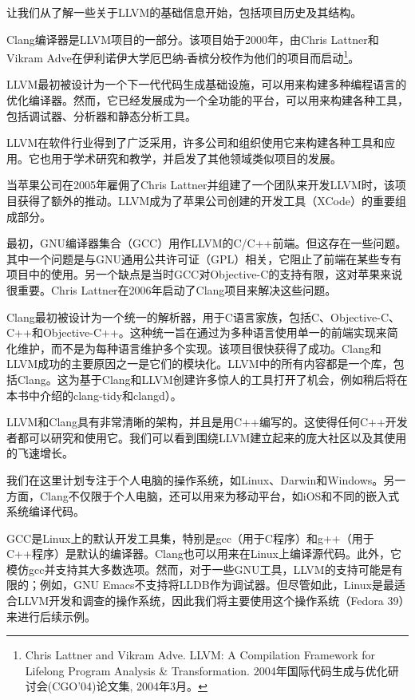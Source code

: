 让我们从了解一些关于LLVM的基础信息开始，包括项目历史及其结构。


Clang编译器是LLVM项目的一部分。该项目始于2000年，由Chris Lattner和Vikram Adve在伊利诺伊大学厄巴纳-香槟分校作为他们的项目而启动\footnote{Chris Lattner and Vikram Adve. LLVM: A Compilation Framework for Lifelong Program Analysis \& Transformation. 2004年国际代码生成与优化研讨会(CGO'04)论文集, 2004年3月。}。

LLVM最初被设计为一个下一代代码生成基础设施，可以用来构建多种编程语言的优化编译器。然而，它已经发展成为一个全功能的平台，可以用来构建各种工具，包括调试器、分析器和静态分析工具。

LLVM在软件行业得到了广泛采用，许多公司和组织使用它来构建各种工具和应用。它也用于学术研究和教学，并启发了其他领域类似项目的发展。

当苹果公司在2005年雇佣了Chris Lattner并组建了一个团队来开发LLVM时，该项目获得了额外的推动。LLVM成为了苹果公司创建的开发工具（XCode）的重要组成部分。

最初，GNU编译器集合（GCC）用作LLVM的C/C++前端。但这存在一些问题。其中一个问题是与GNU通用公共许可证（GPL）相关，它阻止了前端在某些专有项目中的使用。另一个缺点是当时GCC对Objective-C的支持有限，这对苹果来说很重要。Chris Lattner在2006年启动了Clang项目来解决这些问题。

Clang最初被设计为一个统一的解析器，用于C语言家族，包括C、Objective-C、C++和Objective-C++。这种统一旨在通过为多种语言使用单一的前端实现来简化维护，而不是为每种语言维护多个实现。该项目很快获得了成功。Clang和LLVM成功的主要原因之一是它们的模块化。LLVM中的所有内容都是一个库，包括Clang。这为基于Clang和LLVM创建许多惊人的工具打开了机会，例如稍后将在本书中介绍的clang-tidy和clangd）。

LLVM和Clang具有非常清晰的架构，并且是用C++编写的。这使得任何C++开发者都可以研究和使用它。我们可以看到围绕LLVM建立起来的庞大社区以及其使用的飞速增长。


我们在这里计划专注于个人电脑的操作系统，如Linux、Darwin和Windows。另一方面，Clang不仅限于个人电脑，还可以用来为移动平台，如iOS和不同的嵌入式系统编译代码。


GCC是Linux上的默认开发工具集，特别是gcc（用于C程序）和g++（用于C++程序）是默认的编译器。Clang也可以用来在Linux上编译源代码。此外，它模仿gcc并支持其大多数选项。然而，对于一些GNU工具，LLVM的支持可能是有限的；例如，GNU Emacs不支持将LLDB作为调试器。但尽管如此，Linux是最适合LLVM开发和调查的操作系统，因此我们将主要使用这个操作系统（Fedora 39）来进行后续示例。


